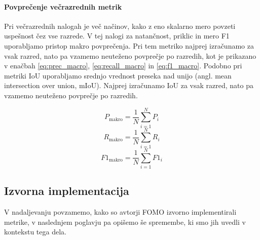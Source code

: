 \documentclass[a4paper,twoside,openright,12pt,slovene]{book}
\begin{document}
        \paragraph{Povprečenje večrazrednih metrik} \label{sct:eir-metrike-povprecenje}
        
        Pri večrazrednih nalogah je več načinov, kako z eno skalarno mero
        povzeti uspešnost čez vse razrede. V tej nalogi za natančnost, priklic
        in mero F1 uporabljamo pristop makro povprečenja. Pri tem metriko
        najprej izračunamo za vsak razred, nato pa vzamemo neuteženo povprečje
        po razredih, kot je prikazano v enačbah
        \ref{eq:prec_macro}, \ref{eq:recall_macro}
        in \ref{eq:f1_macro}. Podobno pri
        metriki IoU uporabljamo srednjo vrednost preseka nad unijo (angl. mean
        intersection over union, mIoU). Najprej izračunamo IoU za vsak razred,
        nato pa vzamemo neuteženo povprečje po razredih.


        \begin{equation}
            P_{\text{makro}} = \frac{1}{N}\sum_{i=1}^N P_{i}
            \label{eq:prec_macro}
        \end{equation}
        \begin{equation}
            R_{\text{makro}} = \frac{1}{N}\sum_{i=1}^N R_{i}
            \label{eq:recall_macro}
        \end{equation}
        \begin{equation}
            F1_{\text{makro}} = \frac{1}{N}\sum_{i=1}^N F1_{i}
            \label{eq:f1_macro}
        \end{equation}

        \subsection{Izvorna implementacija} \label{sct:eir-metrike-izvorna}

            V nadaljevanju povzamemo, kako so avtorji FOMO izvorno
            implementirali metrike, v naslednjem poglavju pa opišemo še
            spremembe, ki smo jih uvedli v kontekstu tega dela.
\end{document}
